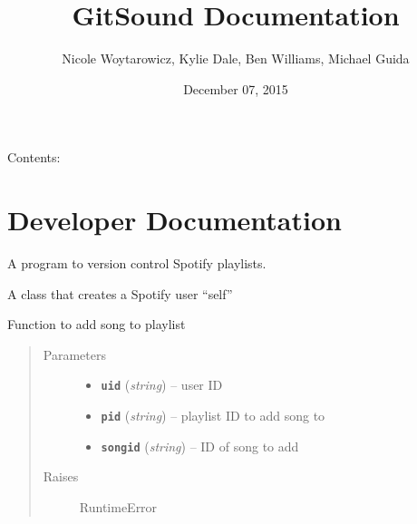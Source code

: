 \documentclass[letterpaper,10pt,english]{sphinxmanual}
\title{GitSound Documentation}
\date{December 07, 2015}
\author{Nicole Woytarowicz, Kylie Dale, Ben Williams, Michael Guida}
\begin{document}
\maketitle
\tableofcontents
{}\label{index::doc}


Contents:


\chapter{Developer Documentation}
\label{code:developer-documentation}\label{code:module-gitsound}\label{code::doc}\label{code:gitsound-documentation}
A program to version control Spotify playlists.

\begin{fulllineitems}
\label{code:gitsound.SpotifyUser}
A class that creates a Spotify user ``self''

\begin{fulllineitems}
\label{code:gitsound.SpotifyUser.add_song_to_playlist}
Function to add song to playlist
\begin{quote}\begin{description}
\item[{Parameters}] \leavevmode\begin{itemize}
\item {} 
\textbf{\texttt{uid}} (\emph{string}) -- user ID

\item {} 
\textbf{\texttt{pid}} (\emph{string}) -- playlist ID to add song to

\item {} 
\textbf{\texttt{songid}} (\emph{string}) -- ID of song to add

\end{itemize}

\item[{Raises}] \leavevmode
RuntimeError

\end{description}\end{quote}

\end{fulllineitems}


\end{fulllineitems}
\end{document}
